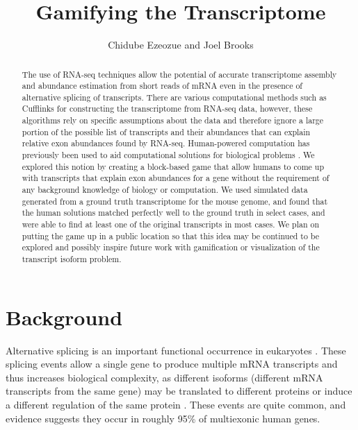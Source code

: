 \documentclass[12pt]{article}
\title{Gamifying the Transcriptome}
\author{Chidube Ezeozue and Joel Brooks}
\begin{document}

\renewcommand\refname{Bibliography}
\maketitle

\begin{abstract}

The use of RNA-seq techniques allow the potential of accurate transcriptome assembly and abundance estimation from short reads of mRNA even in the presence of alternative splicing of transcripts. There are various computational methods such as Cufflinks \citep{trapnell2010transcript} for constructing the transcriptome from RNA-seq data, however, these algorithms rely on specific assumptions about the data and therefore ignore a large portion of the possible list of transcripts and their abundances that can explain relative exon abundances found by RNA-seq. Human-powered computation has previously been used to aid computational solutions for biological problems \citep{kawrykow2012phylo}. We explored this notion by
creating a block-based game that allow humans to come up with transcripts that explain exon abundances for a gene without the requirement of any background knowledge of biology or computation. We used simulated data generated from
a ground truth transcriptome for the mouse genome, and found that the human solutions matched perfectly well to the ground truth in select cases, and were able to find at least one of the original transcripts in most cases. We plan on putting 
the game up in a public location so that this idea may be continued to be explored and possibly inspire future work with gamification or visualization of the transcript isoform problem.

\end{abstract}

\section{Background}
Alternative splicing is an important functional occurrence in eukaryotes \citep{pan2008deep}. These splicing events allow a single gene to produce multiple mRNA transcripts and thus increases biological complexity, as different isoforms (different mRNA transcripts from the same gene) may be translated to different proteins or induce a different regulation of the same protein \citep{trapnell2010transcript}. These events are quite common, and evidence suggests they occur in roughly 95\% of multiexonic human genes.
\end{document}
